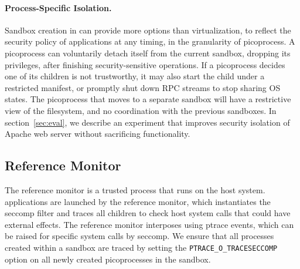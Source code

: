 \paragraph{Process-Specific Isolation.} 
Sandbox creation in \sysname{} can provide
more options than virtualization, to reflect the security policy of applications at any timing,
in the granularity of picoprocess. 
A picoprocess can voluntarily detach itself from the current sandbox, dropping its privileges,
after finishing security-sensitive operations.
If a picoprocess decides one of its children is not trustworthy, it may also start the child under a restricted manifest,
or promptly shut down RPC streams to stop sharing OS states.
The picoprocess that moves to a separate sandbox will have a restrictive view of the filesystem, and no coordination with the previous sandboxes.
In section~\ref{sec:eval}, we describe an experiment that improves security isolation of Apache web server without sacrificing functionality.

\subsection{Reference Monitor}
\label{sec:graphene:security:monitor}

The reference monitor is a trusted process that runs on the host system.
\sysname{} applications are launched by the reference monitor,
which instantiates the seccomp filter and traces all children
to check host system calls that could have external effects.
The reference monitor interposes using ptrace events, 
which can be raised for specific system calls by seccomp.
We ensure that all processes created within a sandbox are traced
by setting the {\tt PTRACE\_O\_TRACESECCOMP} option on all newly created picoprocesses
in the sandbox.


